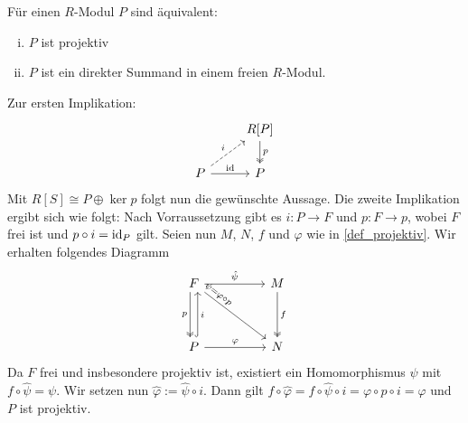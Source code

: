 \begin{satz}[{name=[Projektive Moduln als direkte Summanden in freien Moduln]}]
	Für einen $R$-Modul $P$ sind äquivalent:
	\begin{enumerate}[i),itemsep=0pt]
		\item $P$ ist projektiv
		\item $P$ ist ein direkter Summand in einem freien $R$-Modul.
	\end{enumerate}
\end{satz}
\begin{beweis}
	Zur ersten Implikation:
	\[
		\begin{tikzcd}
			\mbox{}&  R[P] \dar[two heads,"p"] \\
			P \rar["\id"] \urar[dashed,"i"]& P
		\end{tikzcd}
	\]
	Mit $R[S] \cong P \oplus \ker p$ folgt nun die gewünschte Aussage.
	Die zweite Implikation ergibt sich wie folgt: Nach Vorraussetzung gibt es $i \colon P \to F$ und $p \colon F \to p$, wobei $F$ frei ist und $p \circ i = \operatorname{id}_P$ gilt.
	Seien nun $M$, $N$, $f$ und $\varphi$ wie in \autoref{def_projektiv}.
	Wir erhalten folgendes Diagramm
	\[
		\begin{tikzcd}[sep=huge]
			F \rar["\hat{\psi}"] \dar[two heads,"p"',xshift=-3pt]  \drar["\psi=\varphi \circ p",sloped,pos=0.16] & M \dar[two heads,"f"] \\
			P \rar["\varphi"] \uar[hook,"i"',xshift=3pt] & N
		\end{tikzcd}
	\]
	Da $F$ frei und insbesondere projektiv ist, existiert ein Homomorphismus $\hat{\psi}$ mit $f \circ \hat{\psi}=\psi$.
	Wir setzen nun $\hat{\varphi} := \hat{\psi} \circ i$. 
	Dann gilt $f \circ \hat{\varphi} = f \circ \hat{\psi} \circ i = \varphi \circ p \circ i = \varphi$ und $P$ ist projektiv. 
\end{beweis}

